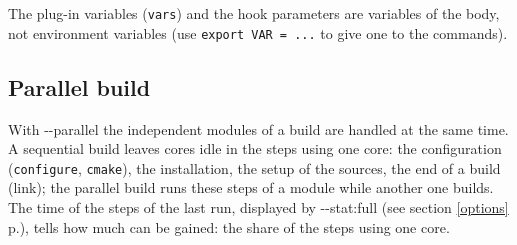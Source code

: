 \documentclass[a4paper,12pt,twoside]{article}
\newcommand{\code}[1]{\texttt{#1}}
\newcommand{\seeref}[1]{see section \ref{#1} p.\pageref{#1}}
\newcommand{\ddash}{-{}-}
\begin{document}
The plug-in variables (\code{vars}) and the hook parameters are
variables of the body, not environment variables (use \code{export VAR =
...} to give one to the commands).

\subsection{Parallel build}
\label{parallel}

With \ddash{}parallel the independent modules of a build are handled at the same time. A sequential build leaves cores idle in the steps using one core: the configuration (\code{configure}, \code{cmake}), the installation, the setup of the sources, the end of a build (link); the parallel build runs these steps of a module while another one builds. The time of the steps of the last run, displayed by \ddash{}stat:full (\seeref{options}), tells how much can be gained: the share of the steps using one core.
\end{document}

